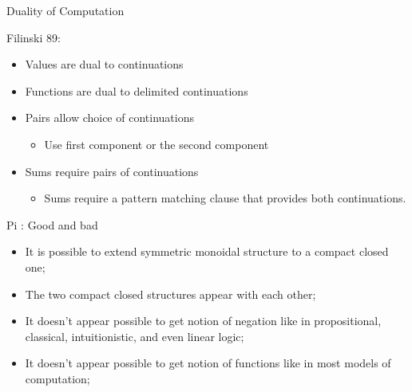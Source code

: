 \documentclass[svgnames,11pt]{beamer}
\newcommand{\red}[1]{{\color{red}{#1}}}
\begin{document}
\begin{frame}{ Duality of Computation } 

  \vfill
  Filinski 89: 
  \begin{itemize}
  \vfill
  \item Values are dual to continuations
  \vfill
  \item Functions are dual to delimited continuations
  \vfill
  \item Pairs allow choice of continuations
    \begin{itemize}
    \item Use first component or the second component
    \end{itemize}

  \vfill
  \item Sums require pairs of continuations
    \begin{itemize}
    \item Sums require a pattern matching clause that provides both
      continuations.
    \end{itemize}

  \vfill
  \end{itemize}

\end{frame}
\begin{frame}{ {{Pi}} : Good and bad} 

\begin{itemize}

  \vfill\item It is possible to \red{independently} extend \red{each}
  symmetric monoidal structure to a compact closed one;

  \vfill\item The two compact closed structures appear \red{incompatible}
  with each other; 

  \vfill\item It doesn't appear possible to get \red{one} notion of negation
  like in propositional, classical, intuitionistic, and even linear logic;

  \vfill\item It doesn't appear possible to get \red{one} notion of functions
  like in most models of computation;

\end{itemize}

\end{frame}
\end{document}
